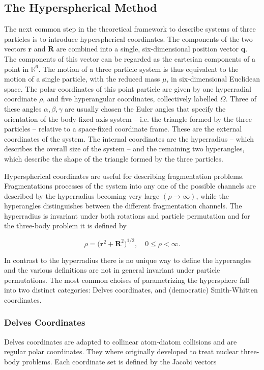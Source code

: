 \documentclass{article}
\numberwithin{equation}{section}
\numberwithin{figure}{section}
\begin{document}
\subsection{The Hyperspherical Method}
The next common step in the theoretical framework to describe systems of three particles is to introduce hyperspherical coordinates. The components of the two vectors $\mathbf{r}$ and $\mathbf{R}$ are combined into a single, six-dimensional position vector $\mathbf{q}$. The components of this vector can be regarded as the cartesian components of a point in $\mathbb{R}^{6}$. The motion of a three particle system is thus equivalent to the motion of a single particle, with the reduced mass $\mu$, in six-dimensional Euclidean space. The polar coordinates of this point particle are given by one hyperradial coordinate $\rho$, and five hyperangular coordinates, collectively labelled $\Omega$. Three of these angles $\alpha, \beta, \gamma$ are usually chosen the Euler angles that specify the  orientation of the body-fixed axis system -- i.e. the triangle formed by the three particles -- relative to a space-fixed coordinate frame. These are the external coordinates of the system. The internal coordinates are the hyperradius -- which describes the overall size of the system -- and the remaining two hyperangles, which describe the shape of the triangle formed by the  three particles. 

Hyperspherical coordinates are useful for describing fragmentation problems. Fragmentations processes of the system into any one of the possible channels are described by the hyperradius becoming very large $(\rho \rightarrow \infty)$, while the hyperangles distinguishes between the different fragmentation channels. The hyperradius is invariant under both rotations and particle permutation and for the three-body problem it is defined by

\begin{equation}
\rho = \Big(\mathbf{r}^{2} + \mathbf{R}^{2}\Big)^{1/2}, \quad 0\leq \rho < \infty.
\end{equation} 

In contrast to the hyperradius there is no unique way to define the hyperangles and the various definitions are not in general invariant under particle permutations. The most common choises of parametrizing the hypersphere fall into two distinct categories: Delves coordinates, and (democratic) Smith-Whitten coordinates. 

\subsubsection{Delves Coordinates}\label{delvescoord}
Delves coordinates are adapted to collinear atom-diatom collisions and are regular polar coordinates. They where originally developed to treat nuclear three-body problems. Each coordinate set is defined by the Jacobi vectors
\end{document}
